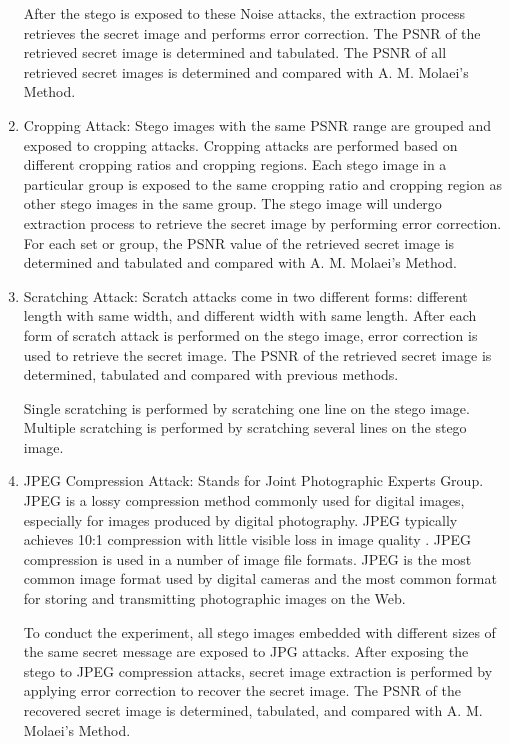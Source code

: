 \documentclass{ittelkom}
\begin{document}
\begin{enumerate}
          After the stego is exposed to these Noise attacks, the extraction process
          retrieves the secret image and performs error correction. The PSNR of the
          retrieved secret image is determined and tabulated. The PSNR of all retrieved
          secret images is determined and compared with A. M. Molaei's Method.

    \item Cropping Attack: Stego images with the same PSNR range are grouped and exposed
          to cropping attacks. Cropping attacks are performed based on different cropping
          ratios and cropping regions. Each stego image in a particular group is exposed
          to the same cropping ratio and cropping region as other stego images in the
          same group. The stego image will undergo extraction process to retrieve the
          secret image by performing error correction. For each set or group, the PSNR
          value of the retrieved secret image is determined and tabulated and compared
          with A. M. Molaei's Method.

    \item Scratching Attack: Scratch attacks come in two different forms: different
          length with same width, and different width with same length. After each form
          of scratch attack is performed on the stego image, error correction is used to
          retrieve the secret image. The PSNR of the retrieved secret image is
          determined, tabulated and compared with previous methods.

          Single scratching is performed by scratching one line on the stego image.
          Multiple scratching is performed by scratching several lines on the stego
          image.

    \item JPEG Compression Attack: Stands for Joint Photographic Experts Group. JPEG is a
          lossy compression method commonly used for digital images, especially for
          images produced by digital photography. JPEG typically achieves 10:1
          compression with little visible loss in image quality \cite{ch2015medical}.
          JPEG compression is used in a number of image file formats. JPEG is the most
          common image format used by digital cameras and the most common format for
          storing and transmitting photographic images on the Web.

          To conduct the experiment, all stego images embedded with different sizes of
          the same secret message are exposed to JPG attacks. After exposing the stego to
          JPEG compression attacks, secret image extraction is performed by applying
          error correction to recover the secret image. The PSNR of the recovered secret
          image is determined, tabulated, and compared with A. M. Molaei's Method.
\end{enumerate}
\end{document}

